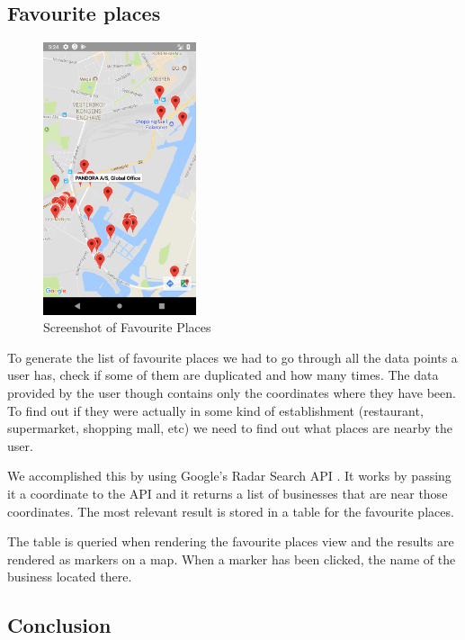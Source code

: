 \documentclass[12p]{article}
\begin{document}
            \subsection{Favourite places}
            
            \begin{figure}[ht]
                \center
                \includegraphics[height=8cm,keepaspectratio]{pics/fav-places-screenshot.png}
                \caption{Screenshot of Favourite Places}
            \end{figure}
            To generate the list of favourite places we had to go through all the data points a user has, check if some of them are duplicated and how many times. The data provided by the user though contains only the coordinates where they have been. To find out if they were actually in some kind of establishment (restaurant, supermarket, shopping mall, etc) we need to find out what places are nearby the user. 
            
            We accomplished this by using Google's Radar Search API \cite{GoogleRadarSearch}. It works by passing it a coordinate to the API and it returns a list of businesses that are near those coordinates. The most relevant result is stored in a table for the favourite places.
            
            The table is queried when rendering the favourite places view and the results are rendered as markers on a map. When a marker has been clicked, the name of the business located there.
		    
		    \subsection{Conclusion}
		
\end{document}

